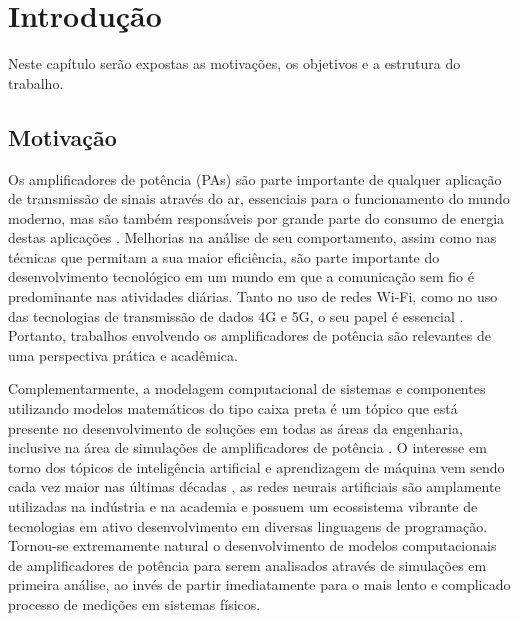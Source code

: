 \chapter{Introdução} \label{cha:introd}
Neste capítulo serão expostas as motivações, os objetivos e a estrutura do trabalho.
\label{item:PI}
\label{item:PA}
\label{item:TLP}
\label{item:MLP}
\label{item:ANN}
\label{item:DPD}
\label{item:PoD}
\label{item:4G}
\label{item:5G}
\label{item:TCC}
\label{item:NMSE}
\label{item:MSE}

\section{Motivação} \label{sec:introd-motiv}
Os amplificadores de potência (PAs) são parte importante de qualquer aplicação de transmissão de sinais através do ar, essenciais para o funcionamento do mundo moderno, mas são também responsáveis por grande parte do consumo de energia destas aplicações \cite{raychaudhuri_frontiers_2012}. Melhorias na análise de seu comportamento, assim como nas técnicas que permitam a sua maior eficiência, são parte importante do desenvolvimento tecnológico em um mundo em que a comunicação sem fio é predominante nas atividades diárias. Tanto no uso de redes Wi-Fi, como no uso das tecnologias de transmissão de dados 4G e 5G, o seu papel é essencial \cite{9676485}. Portanto, trabalhos envolvendo os amplificadores de potência são relevantes de uma perspectiva prática e acadêmica.

Complementarmente, a modelagem computacional de sistemas e componentes utilizando modelos matemáticos do tipo caixa preta é um tópico que está presente no desenvolvimento de soluções em todas as áreas da engenharia, inclusive na área de simulações de amplificadores de potência \cite{pedro_comparative_2005}. O interesse em torno dos tópicos de inteligência artificial e aprendizagem de máquina vem sendo cada vez maior nas últimas décadas \cite{Zhao2021}, as redes neurais artificiais são amplamente utilizadas na indústria e na academia e possuem um ecossistema vibrante de tecnologias em ativo desenvolvimento em diversas linguagens de programação. Tornou-se extremamente natural o desenvolvimento de modelos computacionais de amplificadores de potência para serem analisados através de simulações em primeira análise, ao invés de partir imediatamente para o mais lento e complicado processo de medições em sistemas físicos.


